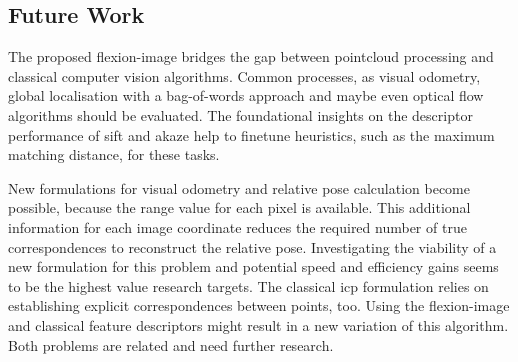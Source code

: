 \subsection{Future Work}

The proposed \gls{flexion-image} bridges the gap between pointcloud processing and classical computer vision algorithms.
Common processes, as visual odometry, global localisation with a bag-of-words approach and maybe even optical flow algorithms should be evaluated.
The foundational insights on the descriptor performance of \acrshort{sift} and \acrshort{akaze} help to finetune heuristics, such as the maximum matching distance, for these tasks.

New formulations for visual odometry and relative pose calculation become possible, because the range value for each pixel is available.
This additional information for each image coordinate reduces the required number of true correspondences to reconstruct the relative pose.
Investigating the viability of a new formulation for this problem and potential speed and efficiency gains seems to be the highest value research targets.
The classical \acrshort{icp} formulation relies on establishing explicit correspondences between points, too.
Using the \gls{flexion-image} and classical feature descriptors might result in a new variation of this algorithm.
Both problems are related and need further research.
